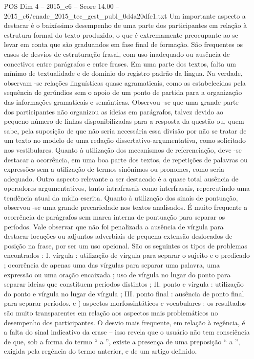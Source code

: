 \begin{textsample}{POS Dim 4 – 2015\_c6 – Score 14.00 – 2015\_c6/enade\_2015\_tec\_gest\_publ\_0d4a20dfe1.txt}
Um importante aspecto a destacar é o baixíssimo desempenho de uma parte dos participantes em relação à estrutura formal do texto produzido, o que é extremamente preocupante ao se levar em conta que são graduandos em fase final de formação.
São frequentes os casos de desvios de estruturação frasal, com uso inadequado ou ausência de conectivos entre parágrafos e entre frases.
Em uma parte dos textos, falta um mínimo de textualidade e de domínio do registro padrão da língua.
Na verdade, observam -se relações linguísticas quase agramaticais, como as estabelecidas pela sequência de gerúndios sem o apoio de um ponto de partida para a organização das informações gramaticais e semânticas.
Observou -se que uma grande parte dos participantes não organizou as ideias em parágrafos, talvez devido ao pequeno número de linhas disponibilizadas para a resposta da questão ou, quem sabe, pela suposição de que não seria necessária essa divisão por não se tratar de um texto no modelo de uma redação dissertativo-argumentativa, como solicitado nos vestibulares.
Quanto à utilização dos mecanismos de referenciação, deve -se destacar a ocorrência, em uma boa parte dos textos, de repetições de palavras ou expressões sem a utilização de termos sinônimos ou pronomes, como seria adequado.
Outro aspecto relevante a ser destacado é a quase total ausência de operadores argumentativos, tanto intrafrasais como interfrasais, repercutindo uma tendência atual da mídia escrita.
Quanto à utilização dos sinais de pontuação, observou -se uma grande precariedade nos textos analisados.
É muito frequente a ocorrência de parágrafos sem marca interna de pontuação para separar os períodos.
Vale observar que não foi penalizada a ausência de vírgula para destacar locuções ou adjuntos adverbiais de pequena extensão deslocados de posição na frase, por ser um uso opcional.
São os seguintes os tipos de problemas encontrados : I. vírgula : utilização de vírgula para separar o sujeito e o predicado ; ocorrência de apenas uma das vírgulas para separar uma palavra, uma expressão ou uma oração encaixada ; uso de vírgula no lugar do ponto para separar ideias que constituem períodos distintos ; II. ponto e vírgula : utilização do ponto e vírgula no lugar de vírgula ; III. ponto final : ausência de ponto final para separar períodos. c ) aspectos morfossintáticos e vocabulares : os resultados são muito transparentes em relação aos aspectos mais problemáticos no desempenho dos participantes.
O desvio mais frequente, em relação à regência, é a falta do sinal indicativo da crase – isso revela que o usuário não tem consciência de que, sob a forma do termo “ a ”, existe a presença de uma preposição “ a ”, exigida pela regência do termo anterior, e de um artigo definido.

\end{textsample}
